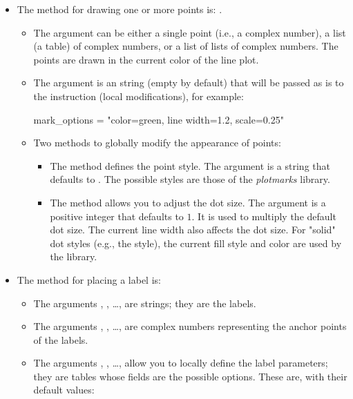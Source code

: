 \begin{itemize}
    \item The method for drawing one or more points is: .

\begin{itemize}
    \item The argument  can be either a single point (i.e., a complex number), a list (a table) of complex numbers, or a list of lists of complex numbers. The points are drawn in the current color of the line plot.
     \item The  argument is an string (empty by default) that will be passed as is to the \drawcmd instruction (local modifications), for example:
\begin{TeXcode}
mark_options = "color=green, line width=1.2, scale=0.25"
\end{TeXcode}

    \item Two methods to globally modify the appearance of points:
    \begin{itemize}
        \item The  method defines the point style. The  argument is a  string that defaults to . The possible styles are those of the \emph{plotmarks} library.         
        \item The  method allows you to adjust the dot size. The  argument is a positive integer that defaults to $1$. It is used to multiply the default dot size. The current line width also affects the dot size. For "solid" dot styles (e.g., the  style), the current fill style and color are used by the library.
    \end{itemize}
\end{itemize}

    \item The method for placing a label is:

\begin{itemize}
    \item The arguments , , \ldots, are strings; they are the labels.
    \item The arguments , , \ldots, are complex numbers representing the anchor points of the labels.
    \item The arguments , , \ldots, allow you to locally define the label parameters; they are tables whose fields are the possible options. These are, with their default values:


\end{itemize}
\end{itemize}
